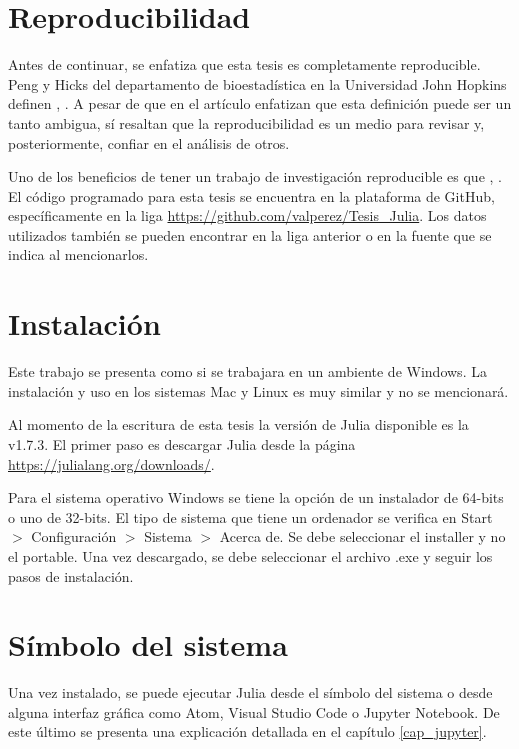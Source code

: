 \section{Reproducibilidad}
Antes de continuar, se enfatiza que esta tesis es completamente reproducible. Peng y Hicks del departamento de bioestadística en la Universidad John Hopkins definen , \cite{peng2021reproducible}. A pesar de que en el artículo enfatizan que esta definición puede ser un tanto ambigua, sí resaltan que la reproducibilidad es un medio para revisar y, posteriormente, confiar en el análisis de otros. 

Uno de los beneficios de tener un trabajo de investigación reproducible es que , \cite{peng2021reproducible}. El código programado para esta tesis se encuentra en la plataforma de GitHub, específicamente en la liga \url{https://github.com/valperez/Tesis_Julia}. Los datos utilizados también se pueden encontrar en la liga anterior o en la fuente que se indica al mencionarlos. 

\section{Instalación}
Este trabajo se presenta como si se trabajara en un ambiente de \textsf{Windows}. La instalación y uso en los sistemas \textsf{Mac} y \textsf{Linux} es muy similar y no se mencionará.  

Al momento de la escritura de esta tesis la versión de \textsf{Julia} disponible es la \textsf{v1.7.3}. El primer paso es descargar \textsf{Julia} desde la página \url{https://julialang.org/downloads/}. 

Para el sistema operativo \textsf{Windows} se tiene la opción de un instalador de 64-bits o uno de 32-bits. El tipo de sistema que tiene un ordenador se verifica en \textsf{Start} $>$ \textsf{Configuración} $>$ \textsf{Sistema} $>$ \textsf{Acerca de}. Se debe seleccionar el \textsf{installer} y no el \textsf{portable}. Una vez descargado, se debe seleccionar el archivo \textsf{.exe} y seguir los pasos de instalación. 

\section{Símbolo del sistema}
Una vez instalado, se puede ejecutar \textsf{Julia} desde el símbolo del sistema o desde alguna interfaz gráfica como \textsf{Atom}, \textsf{Visual Studio Code} o \textsf{Jupyter Notebook}. De este último se presenta una explicación detallada en el capítulo \ref{cap_jupyter}. 

